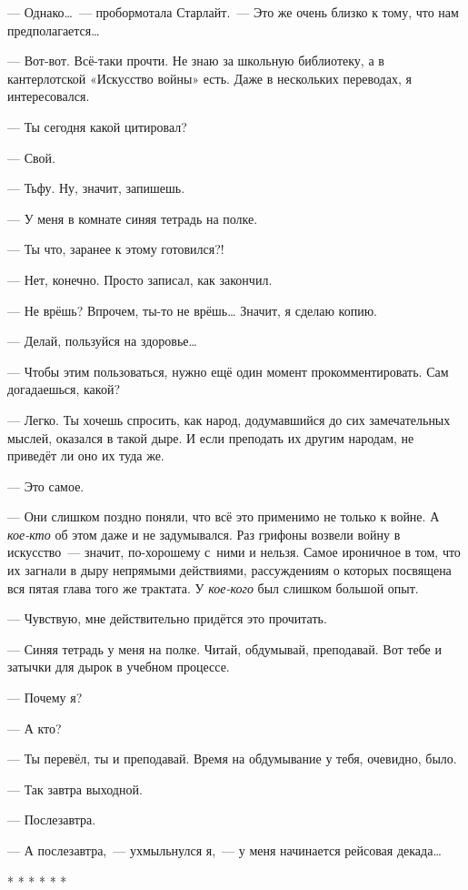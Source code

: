 \documentclass[fontsize=11pt,a5paper,titlepage=firstcover]{scrbook}
\begin{document}
--- Однако{\ldots}~--- пробормотала Старлайт.~--- Это же очень близко к тому, что нам предполагается{\ldots}

--- Вот-вот. Всё-таки прочти. Не знаю за школьную библиотеку, а в кантерлотской «Искусство войны» есть. Даже в нескольких переводах, я интересовался.

--- Ты сегодня какой цитировал?

--- Свой.

--- Тьфу. Ну, значит, запишешь.

--- У меня в комнате синяя тетрадь на полке.

--- Ты что, заранее к этому готовился?!

--- Нет, конечно. Просто записал, как закончил.

--- Не врёшь? Впрочем, ты-то не врёшь{\ldots} Значит, я сделаю копию.

--- Делай, пользуйся на здоровье{\ldots}

--- Чтобы этим пользоваться, нужно ещё один момент прокомментировать. Сам догадаешься, какой?

--- Легко. Ты хочешь спросить, как народ, додумавшийся до сих замечательных мыслей, оказался в такой дыре. И если преподать их другим народам, не приведёт ли оно их туда же.

--- Это самое.

--- Они слишком поздно поняли, что всё это применимо не только к войне. А \emph{кое-кто} об этом даже и не задумывался. Раз грифоны возвели войну в искусство~--- значит, по-хорошему с~ними и нельзя. Самое ироничное в том, что их загнали в дыру непрямыми действиями, рассуждениям о которых посвящена вся пятая глава того же трактата. У \emph{кое-кого} был слишком большой опыт.

--- Чувствую, мне действительно придётся это прочитать.

--- Синяя тетрадь у меня на полке. Читай, обдумывай, преподавай. Вот тебе и затычки для дырок в учебном процессе.

--- Почему я?

--- А кто?

--- Ты перевёл, ты и преподавай. Время на обдумывание у тебя, очевидно, было.

--- Так завтра выходной.

--- Послезавтра.

--- А послезавтра,~--- ухмыльнулся я,~--- у меня начинается рейсовая декада{\ldots}
\begin{center}
	* * * * * *
\end{center}
\end{document}
